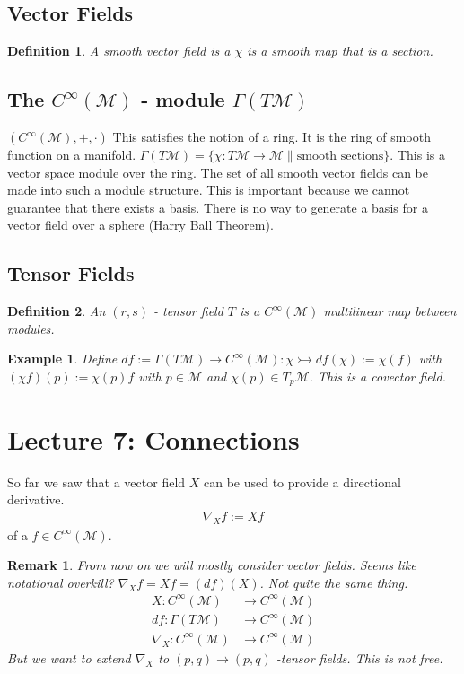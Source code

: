 \documentclass[10pt, oneside]{article}
\newcommand{\M}{\mathcal{M}}
\newtheorem{defn}{Definition}
\newtheorem{example}{Example}
\newtheorem{remark}{Remark}
\begin{document}
  \subsection*{Vector Fields}
  \begin{defn}
     A smooth vector field is a $\chi$ is a smooth map that is a section.
  \end{defn}
  \subsection*{The $C^\infty (\M)$ - module $\Gamma (T \M)$}
  $(C^{\infty} (\M), +, \cdot)$ This satisfies the notion of a ring. It is the ring of smooth function on a manifold. $\Gamma (T \M) = \{ \chi : T \M \to \M \| \text{smooth sections} \}$. This is a vector space module over the ring. The set of all smooth vector fields can be made into such a module structure. This is important because we cannot guarantee that there exists a basis. There is no way to generate a basis for a vector field over a sphere (Harry Ball Theorem).
  \subsection*{Tensor Fields}
  \begin{defn}
     An $(r,s)$ - tensor field $T$ is a $C^{\infty} (\M)$ multilinear map between modules.
  \end{defn}
  \begin{example}
     Define $df := \Gamma(T \M) \to C^\infty (\M): \chi \rightarrowtail df(\chi) := \chi (f)$ with $(\chi f)(p) := \chi (p) f $ with $p \in \M$ and $\chi(p) \in T_p \M$. This is a covector field.
  \end{example}
\section*{Lecture 7: Connections}
 So far we saw that a vector field $X$ can be used to provide a directional derivative.
 \begin{align*}
     \nabla_X f := Xf
 \end{align*}
 of a $f \in C^\infty (\M)$.
 \begin{remark}
  From now on we will mostly consider vector fields. Seems like notational overkill? $\nabla_X f = Xf = (df)(X)$. Not quite the same thing.
  \begin{align*}
     X: C^{\infty} (\M) &\to C^{\infty} (\M) \\
     df: \Gamma(T \M) &\to C^\infty (\M) \\
     \nabla_X: C^\infty (\M) &\to C^\infty (\M)
  \end{align*}
  But we want to extend $\nabla_X$ to $(p,q) \to (p,q)$ -tensor fields. This is not free.
 \end{remark}
\end{document}
